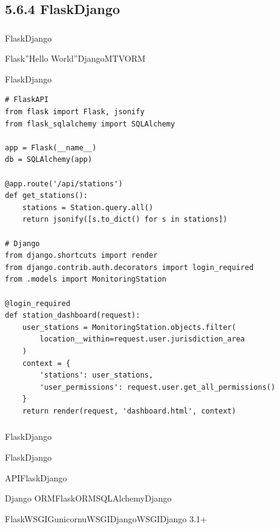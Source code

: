 \hypertarget{flaskdjango}{%
\subsection{5.6.4 FlaskDjango}\label{flaskdjango}}

\hypertarget{section-84}{%
\subsubsection{}\label{section-84}}

\important{}Flask\important{}Django\important{}

\important{}Flask''Hello World''DjangoMTVORM

\important{}FlaskDjango

\begin{lstlisting}[style=python]
# FlaskAPI
from flask import Flask, jsonify
from flask_sqlalchemy import SQLAlchemy

app = Flask(__name__)
db = SQLAlchemy(app)

@app.route('/api/stations')
def get_stations():
    stations = Station.query.all()
    return jsonify([s.to_dict() for s in stations])

# Django
from django.shortcuts import render
from django.contrib.auth.decorators import login_required
from .models import MonitoringStation

@login_required
def station_dashboard(request):
    user_stations = MonitoringStation.objects.filter(
        location__within=request.user.jurisdiction_area
    )
    context = {
        'stations': user_stations,
        'user_permissions': request.user.get_all_permissions()
    }
    return render(request, 'dashboard.html', context)
\end{lstlisting}

\hypertarget{section-85}{%
\subsubsection{}\label{section-85}}

\important{}\important{}FlaskDjango

\important{}FlaskDjango

\important{}APIFlaskDjango

\important{}Django ORMFlaskORMSQLAlchemyDjango

\important{}FlaskWSGIGunicornuWSGIDjangoWSGIDjango 3.1+

\hypertarget{section-86}{%
\subsubsection{}\label{section-86}}

